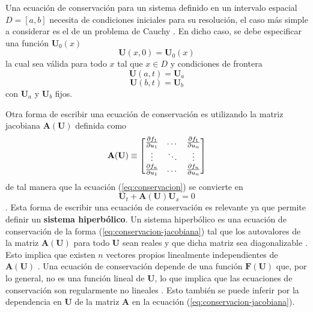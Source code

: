 Una ecuación de conservación para un sistema definido en un intervalo espacial $D = [a,b]$ necesita de condiciones iniciales para su resolución, el caso más simple a considerar es el de un problema de Cauchy \cite{Leveque}. En dicho caso, se debe especificar una función $\mathbf{U}_0(x)$
\begin{equation}
	\mathbf{U}(x,0) = \mathbf{U}_0(x)
\end{equation} 
la cual sea válida para todo $x$ tal que $x \in D$ y condiciones de frontera
\begin{equation}
	\mathbf{U}(a,t) = \mathbf{U}_{a}
\end{equation}
\begin{equation}
	\mathbf{U}(b,t) = \mathbf{U}_{b}
\end{equation}
con $\mathbf{U}_{a}$ y $\mathbf{U}_{b}$ fijos.

Otra forma de escribir una ecuación de conservación es utilizando la matriz jacobiana $\mathbf{A(\mathbf{U})}$ definida como
\begin{equation}
	\mathbf{A(\mathbf{U})} \equiv
	\begin{bmatrix}
		\pdv{f_1}{u_1} & \dots & \pdv{f_1}{u_n} \\
		\vdots & \ddots & \vdots \\
		\pdv{f_n}{u_1} & \dots & \pdv{f_n}{u_n} \\
	\end{bmatrix}
\end{equation}
de tal manera que la ecuación (\ref{eq:conservacion}) se convierte en
\begin{equation}
	\mathbf{U}_{t} + \mathbf{A(\mathbf{U})}\mathbf{U}_{x} = 0
	\label{eq:conservacion-jacobiana}
\end{equation}.
Esta forma de escribir una ecuación de conservación es relevante ya que permite definir un \textbf{sistema hiperbólico}. Un sistema hiperbólico es una ecuación de conservación de la forma (\ref{eq:conservacion-jacobiana}) tal que los autovalores de la matriz $\mathbf{A(\mathbf{U})}$ para todo $\mathbf{U}$ sean reales y que dicha matriz sea diagonalizable \cite{Leveque}. Esto implica que existen $n$ vectores propios linealmente independientes de $\mathbf{A(\mathbf{U})}$ \cite{Leveque}.
Una ecuación de conservación depende de una función $\mathbf{F(\mathbf{U})}$ que, por lo general, no es una función lineal de $\mathbf{U}$, lo que implica que las ecuaciones de conservación son regularmente no lineales \cite{Leveque}. Esto también se puede inferir por la dependencia en $\mathbf{U}$ de la matriz $\mathbf{A}$ en la ecuación (\ref{eq:conservacion-jacobiana}).
